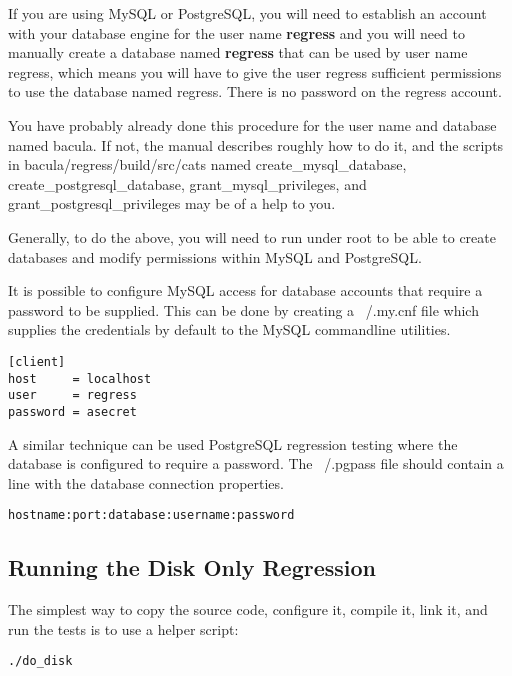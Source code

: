 If you are using MySQL or PostgreSQL, you will need to establish an
account with your database engine for the user name {\bf regress} and
you will need to manually create a database named {\bf regress} that can be
used by user name regress, which means you will have to give the user
regress sufficient permissions to use the database named regress.
There is no password on the regress account.

You have probably already done this procedure for the user name and
database named bacula.  If not, the manual describes roughly how to
do it, and the scripts in bacula/regress/build/src/cats named
create\_mysql\_database, create\_postgresql\_database, grant\_mysql\_privileges,
and grant\_postgresql\_privileges may be of a help to you.

Generally, to do the above, you will need to run under root to
be able to create databases and modify permissions within MySQL and
PostgreSQL.

It is possible to configure MySQL access for database accounts that
require a password to be supplied. This can be done by creating a ~/.my.cnf
file which supplies the credentials by default to the MySQL commandline
utilities.

\begin{verbatim}
[client]
host     = localhost
user     = regress
password = asecret
\end{verbatim}

A similar technique can be used PostgreSQL regression testing where the
database is configured to require a password. The ~/.pgpass file should
contain a line with the database connection properties.

\begin{verbatim}
hostname:port:database:username:password
\end{verbatim}

\subsection{Running the Disk Only Regression}

The simplest way to copy the source code, configure it, compile it, link
it, and run the tests is to use a helper script:

\footnotesize
\begin{verbatim}
./do_disk
\end{verbatim}
\normalsize




